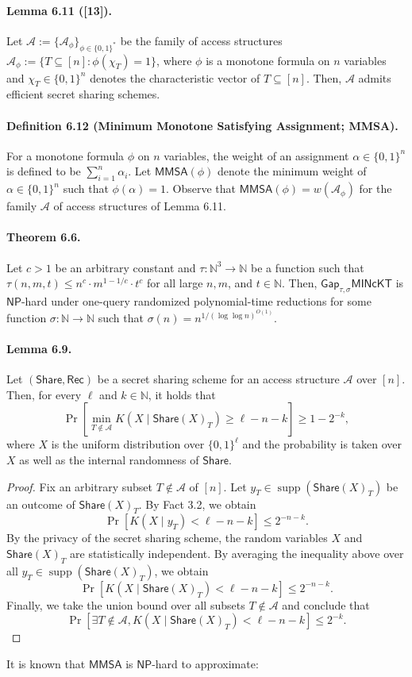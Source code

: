 \documentclass[10pt,a4paper]{article}
\begin{document}
\paragraph{Lemma 6.11 ([13]).}
Let $\mathcal A:=\{\mathcal A_\phi\}_{\phi\in\{0,1\}^*}$ be the family of access structures $\mathcal A_\phi:=\{T\subseteq[n]:\phi(\chi_T)=1\}$, where $\phi$ is a monotone formula on $n$ variables and $\chi_T\in\{0,1\}^n$ denotes the characteristic vector of $T\subseteq[n]$. Then, $\mathcal A$ admits efficient secret sharing schemes.
\paragraph{Definition 6.12 (Minimum Monotone Satisfying Assignment; MMSA).}
For a monotone formula $\phi$ on $n$ variables, the weight of an assignment $\alpha\in\{0,1\}^n$ is defined to be $\sum_{i=1}^n\alpha_i$. Let $\mathsf{MMSA}(\phi)$ denote the minimum weight of $\alpha\in\{0,1\}^n$ such that $\phi(\alpha)=1$.
Observe that $\mathsf{MMSA}(\phi)=w(\mathcal A_\phi)$ for the family $\mathcal A$ of access structures of Lemma 6.11.

\paragraph{Theorem 6.6.}
Let $c>1$ be an arbitrary constant and $\tau:\mathbb N^3\to\mathbb N$ be a function such that $\tau(n,m,t)\leq n^c\cdot m^{1-1/c}\cdot t^c$ for all large $n,m$, and $t\in\mathbb N$. Then, $\mathsf{Gap}_{\tau,\sigma}\mathsf{MINcKT}$ is $\mathsf{NP}$-hard under one-query randomized polynomial-time reductions for some function $\sigma:\mathbb N\to\mathbb N$ such that $\sigma(n)=n^{1/(\log\log n)^{O(1)}}$.

\paragraph{Lemma 6.9.}
Let $(\mathsf{Share},\mathsf{Rec})$ be a secret sharing scheme for an access structure $\mathcal A$ over $[n]$. Then, for every $\ell$ and $k\in\mathbb N$, it holds that
\[\Pr\left[\min_{T\notin\mathcal A}K(X\mid\mathsf{Share}(X)_T)\geq\ell-n-k\right]\geq1-2^{-k},\]
where $X$ is the uniform distribution over $\{0,1\}^\ell$ and the probability is taken over $X$ as well as the internal randomness of $\mathsf{Share}$.
\begin{proof}
Fix an arbitrary subset $T\notin\mathcal A$ of $[n]$. Let $y_T\in\operatorname{supp}(\mathsf{Share}(X)_T)$ be an outcome of $\mathsf{Share}(X)_T$. By Fact 3.2, we obtain
\[\Pr[K(X\mid y_T)<\ell-n-k]\leq2^{-n-k}.\]
By the privacy of the secret sharing scheme, the random variables $X$ and $\mathsf{Share}(X)_T$ are statistically independent. By averaging the inequality above over all $y_T\in\operatorname{supp}(\mathsf{Share}(X)_T)$, we obtain
\[\Pr[K(X\mid\mathsf{Share}(X)_T)<\ell-n-k]\leq2^{-n-k}.\]
Finally, we take the union bound over all subsets $T\notin\mathcal A$ and conclude that
\[\Pr[\exists T\notin\mathcal A,K(X\mid\mathsf{Share}(X)_T)<\ell-n-k]\leq2^{-k}.\]
\end{proof}
It is known that $\mathsf{MMSA}$ is $\mathsf{NP}$-hard to approximate:
\end{document}
